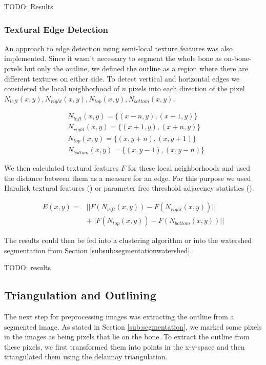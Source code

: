 \documentclass[pdftex,12pt,a4paper]{report}
\begin{document}
TODO: Results

\subsubsection{Textural Edge Detection}

An approach to edge detection using semi-local texture features was also implemented. Since it wasn't necessary to segment the whole bone as on-bone-pixels but only the outline, we defined the outline as a region where there are different textures on either side. To detect vertical and horizontal edges we considered the local neighborhood of $n$ pixels into each direction of the pixel $N_{left}(x,y), N_{right}(x,y), N_{top}(x,y), N_{bottom}(x,y)$.

\begin{equation}
\begin{split}
	& N_{left}(x,y) = \{ (x-n,y), (x-1,y) \} \\
	& N_{right}(x,y) = \{ (x+1,y), (x+n,y) \} \\
	& N_{top}(x,y) = \{ (x,y+n), (x,y+1) \} \\
	& N_{bottom}(x,y) = \{ (x,y-1), (x,y-n) \}
\end{split}
\end{equation}

We then calculated textural features $F$ for these local neighborhoods and used the distance between them as a measure for an edge. For this purpose we used Haralick textural features (\cite{haralick1973textural}) or parameter free threshold adjacency statistics (\cite{hamilton2007fast}). 

\begin{equation}
\begin{split}
E(x,y) = & ||F(N_{left}(x,y)) -F(N_{right}(x,y))|| \\ & + ||F(N_{top}(x,y)) - F(N_{bottom}(x,y))||
\end{split}
\end{equation}

The results could then be fed into a clustering algorithm or into the watershed segmentation from Section \ref{subsub:segmentationwatershed}.

TODO: results

\subsection{Triangulation and Outlining}

The next step for preprocessing images was extracting the outline from a segmented image. As stated in Section
\ref{sub:segmentation}, we marked some pixels in the images as being pixels that lie on the bone.
To extract the outline from these pixels, we first transformed them into points in the x-y-space and then
triangulated them using the delaunay triangulation.
\end{document}
